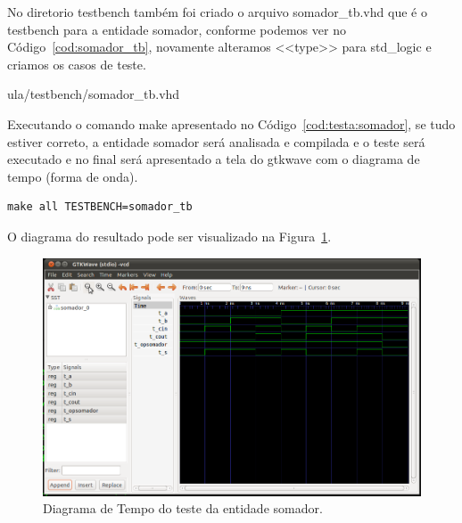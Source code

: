 \documentclass[a4paper,11pt]{report}
\begin{document}
\lstset{language=VHDL}
\lstset{numbers=left, numberstyle=\tiny, stepnumber=1, numbersep=3pt}


No diretorio testbench também foi criado o arquivo somador\_tb.vhd que é o testbench para a entidade somador, conforme podemos ver no Código~\ref{cod:somador_tb}, novamente alteramos <<type>> para std\_logic e criamos os casos de teste.

\lstset{language=VHDL}
\lstset{numbers=left, numberstyle=\tiny, stepnumber=1, numbersep=3pt}
 {ula/testbench/somador_tb.vhd}

Executando o comando make apresentado no Código~\ref{cod:testa:somador}, se tudo estiver correto, a entidade somador será analisada e compilada e o teste será executado e no final será apresentado a tela do gtkwave com o diagrama de tempo (forma de onda).

\lstset{numbers=left, numberstyle=\tiny, stepnumber=1, numbersep=3pt}
\begin{lstlisting}[label=cod:testa:somador,caption=Comando para executar o testbench da entidade somador.]
  make all TESTBENCH=somador_tb
\end{lstlisting}

O diagrama do resultado pode ser visualizado na Figura~\ref{fig:gtw:somador}.

\begin{figure}[H]
\centering
\includegraphics[width=1\textwidth]{figuras/gtw_somador.png}
\caption{Diagrama de Tempo do teste da entidade somador.}
\label{fig:gtw:somador}
\end{figure}
\end{document}
